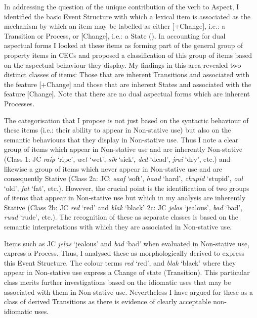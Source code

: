 In addressing the question of the unique contribution of the verb to Aspect, I identified the basic Event Structure with which a lexical item is associated as the mechanism by which an item may be labelled as either [+Change], i.e.: a Transition or Process, or [\textminus Change], i.e.: a State (\citealt{Pustejovsky1988,Pustejovsky1991}). In accounting for dual aspectual forms I looked at these items as forming part of the general group of property items in CECs and proposed a classification of this group of items based on the aspectual behaviour they display. My findings in this area revealed two distinct classes of items: Those that are inherent Transitions and associated with the feature [+Change] and those that are inherent States and associated with the feature [\textminus Change]. Note that there are no dual aspectual forms which are inherent Processes. 

The categorisation that I propose is not just based on the syntactic behaviour of these items (i.e.: their ability to appear in Non-stative use) but also on the semantic behaviours that they display in Non-stative use. Thus I note a clear group of items which appear in Non-stative use and are inherently Non-stative (Class 1: JC \textit{raip} `ripe', \textit{wet} `wet', \textit{sik} `sick', \textit{ded} `dead', \textit{jrai} `dry', etc.) and likewise a group of items which never appear in Non-stative use and are consequently Stative (Class 2a: JC: \textit{saaf} ‘soft’, \textit{haad} `hard', \textit{chupid} `stupid', \textit{oul} `old', \textit{fat} `fat', etc.). However, the crucial point is the identification of two groups of items that appear in Non-stative use but which in my analysis are inherently Stative (Class 2b: JC \textit{red} `red' and \textit{blak} `black' 2c: JC \textit{jelas} `jealous', \textit{bad} `bad', \textit{ruud} `rude', etc.). The recognition of these as separate classes is based on the semantic interpretations with which they are associated in Non-stative use. 

Items such as JC \textit{jelas} `jealous' and \textit{bad} `bad' when evaluated in Non-stative use, express a Process. Thus, I analysed these as morphologically derived to express this Event Structure. The colour terms \textit{red} `red', and \textit{blak} `black' where they appear in Non-stative use express a Change of state (Transition). This particular class merits further investigations based on the idiomatic uses that may be associated with them in Non-stative use. Nevertheless I have argued for these as a class of derived Transitions as there is evidence of clearly acceptable non-idiomatic uses. 

